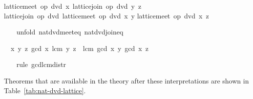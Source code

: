 \begin{isabellebody}
\begin{isamarkuptxt}
\begin{isabelle}
lattice{\isachardot}meet\ op\ dvd\ x\ {\isacharparenleft}lattice{\isachardot}join\ op\ dvd\ y\ z{\isacharparenright}\ {\isacharequal}\isanewline
{}lattice{\isachardot}join\ op\ dvd\ {\isacharparenleft}lattice{\isachardot}meet\ op\ dvd\ x\ y{\isacharparenright}\isanewline
{}lattice{\isachardot}meet\ op\ dvd\ x\ z{\isacharparenright}%
\end{isabelle}%
\end{isamarkuptxt}%
\isamarkuptrue%
\ \ \isamarkupfalse%
\ {\isacharparenleft}unfold\ nat{\isacharunderscore}dvd{\isacharunderscore}meet{\isacharunderscore}eq\ nat{\isacharunderscore}dvd{\isacharunderscore}join{\isacharunderscore}eq{\isacharparenright}%
\begin{isamarkuptxt}%
\begin{isabelle}%
\ {}{\isachardot}\ {\isasymAnd}x\ y\ z{\isachardot}\ gcd\ x\ {\isacharparenleft}lcm\ y\ z{\isacharparenright}\ {\isacharequal}\ lcm\ {\isacharparenleft}gcd\ x\ y{\isacharparenright}\ {\isacharparenleft}gcd\ x\ z{\isacharparenright}%
\end{isabelle}%
\end{isamarkuptxt}%
\isamarkuptrue%
\ \ \isamarkupfalse%
\ {\isacharparenleft}rule\ gcd{\isacharunderscore}lcm{\isacharunderscore}distr{\isacharparenright}\ \isamarkupfalse%
%
\endisatagvisible
{\isafoldvisible}%
%
\isadelimvisible
%
\endisadelimvisible
%
\begin{isamarkuptext}%
Theorems that are available in the theory after these
  interpretations are shown in Table~\ref{tab:nat-dvd-lattice}.


\end{isamarkuptext}
\end{isabellebody}
